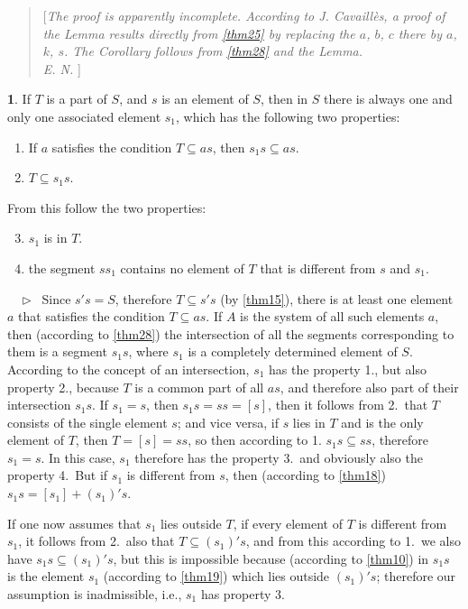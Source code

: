 \documentclass[leqno,hidelinks]{article}
\theoremstyle{definition}
\newtheorem{satz}{\protect\satzname}
\newcommand{\satzname}{}
\renewcommand{\satzname}{\hspace{-4pt}.\ Satz}%
\renewcommand{\satzname}{\hspace{-4pt}.\ Theorem}%
\newcommand\beweis{ $ \phantom{'.'} \rhd \ $}%
\newcommand{\partof}{\subseteq}
\newcommand{\sref}[1]{\underline{\ref{#1}}}%
\begin{document}
\begin{paracol}{2}
\begin{quote}
[\emph{The proof is apparently incomplete. According to J. Cavaillès, a proof of
the Lemma results directly from \sref{thm25} by replacing the $a$, $b$, $c$ there
by $a$, $k$, $s$. The Corollary follows from \sref{thm28} and the Lemma.
\ \\
E. N.
}]\end{quote}


\begin{satz}\label{thm29}
If $T$ is a part of $S$, and $s$ is an element of $S$, then in $S$ there is always
one and only one associated element $s_1$, which has the following two properties:
\begin{enumerate} \setcounter{enumi}{0} \setlength\itemsep{-0.25em}
  \item If $a$ satisfies the condition $T \partof as$, then $s_1s \partof as$.
  \item $T \partof s_1s$.
\end{enumerate}
From this follow the two properties:
\begin{enumerate} \setcounter{enumi}{2} \setlength\itemsep{-0.25em}
  \item $s_1$ is in $T$.
  \item the segment $ss_1$ contains no element of $T$ that is different from $s$ and $s_1$.
\end{enumerate}
\beweis
Since $s's = S$, therefore $T \partof s's$ (by \sref{thm15}), there is at least
one element $a$ that satisfies the condition $T \partof as$. If $A$ is the system
of all such elements $a$, then (according to \sref{thm28}) the intersection of
all the segments corresponding to them is a segment $s_1s$, where $s_1$ is a
completely determined element of $S$. According to the concept of an intersection,
$s_1$ has the property 1., but also property 2., because $T$ is a common part of
all $as$, and therefore also part of their intersection $s_1s$. If $s_1 = s$,
then $s_1s = ss = [s]$, then it follows from 2.\ that $T$ consists of the single
element $s$; and vice versa, if $s$ lies in $T$ and is the only element of $T$,
then $T = [s] = ss$, so then according to 1. $s_1s \partof ss$, therefore $s_1 = s$.
In this case, $s_1$ therefore has the property 3.\ and obviously also the property
4.\ But if $s_1$ is different from $s$, then (according to \sref{thm18})
$s_1s = [s_1] + (s_1)'s$.

If one now assumes that $s_1$ lies outside $T$, if every element of $T$ is
different from $s_1$, it follows from 2.\ also that $T \partof (s_1)'s$, and from
this according to 1.\ we also have $s_1s \partof (s_1)'s$, but this is impossible
because (according to \sref{thm10}) in $s_1s$ is the element $s_1$ (according to
\sref{thm19}) which lies outside $(s_1)'s$; therefore our assumption is inadmissible,
i.e., $s_1$ has property 3.


\end{satz}
\end{paracol}
\end{document}
